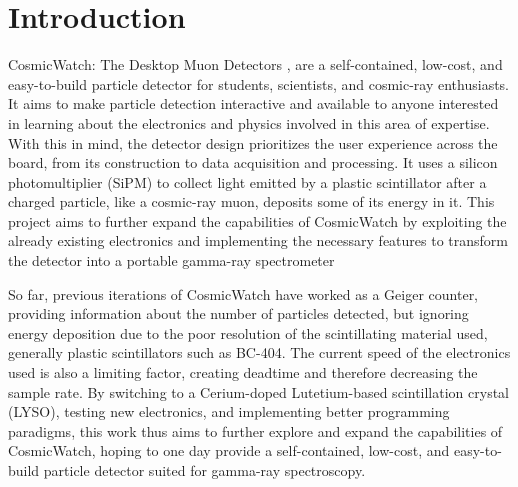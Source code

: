 \chapter{Introduction}

CosmicWatch: The Desktop Muon Detectors \cite{axani2019physics}, are a self-contained, low-cost, and easy-to-build particle detector for students, scientists, and cosmic-ray enthusiasts. It aims to make particle detection interactive and available to anyone interested in learning about the electronics and physics involved in this area of expertise. With this in mind, the detector design prioritizes the user experience across the board, from its construction to data acquisition and processing. It uses a silicon photomultiplier (SiPM) to collect light emitted by a plastic scintillator after a charged particle, like a cosmic-ray muon, deposits some of its energy in it. This project aims to further expand the capabilities of CosmicWatch by exploiting the already existing electronics and implementing the necessary features to transform the detector into a portable gamma-ray spectrometer

So far, previous iterations of CosmicWatch have worked as a Geiger counter, providing information about the number of particles detected, but ignoring energy deposition due to the poor resolution of the scintillating material used, generally plastic scintillators such as BC-404. The current speed of the electronics used is also a limiting factor, creating deadtime and therefore decreasing the sample rate. By switching to a Cerium-doped Lutetium-based scintillation crystal (LYSO), testing new electronics, and implementing better programming paradigms, this work thus aims to further explore and expand the capabilities of CosmicWatch, hoping to one day provide a self-contained, low-cost, and easy-to-build particle detector suited for gamma-ray spectroscopy.